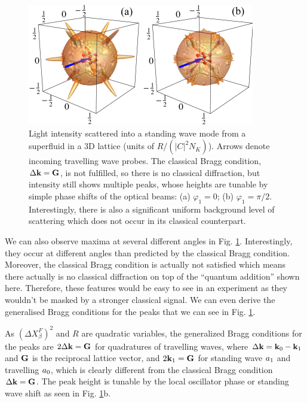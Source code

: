 \begin{figure}[htbp!]
  \centering
  \includegraphics[width=\linewidth]{Ep1}
  \caption[Light Scattering Angular Distribution]{Light intensity
    scattered into a standing wave mode from a superfluid in a 3D
    lattice (units of $R/(|C|^2N_K)$). Arrows denote incoming
    travelling wave probes. The classical Bragg condition,
    $\Delta \mathbf{k} = \mathbf{G}$, is not fulfilled, so there is no classical
    diffraction, but intensity still shows multiple peaks, whose
    heights are tunable by simple phase shifts of the optical beams:
    (a) $\varphi_1=0$; (b) $\varphi_1=\pi/2$. Interestingly, there is
    also a significant uniform background level of scattering which
    does not occur in its classical counterpart. }
  \label{fig:scattering}
\end{figure}

We can also observe maxima at several different angles in
Fig. \ref{fig:scattering}. Interestingly, they occur at different
angles than predicted by the classical Bragg condition. Moreover, the
classical Bragg condition is actually not satisfied which means there
actually is no classical diffraction on top of the ``quantum
addition'' shown here. Therefore, these features would be easy to see
in an experiment as they wouldn't be masked by a stronger classical
signal.  We can even derive the generalised Bragg conditions for the
peaks that we can see in Fig. \ref{fig:scattering}. 


As $(\Delta X^F_\beta)^2$ and $R$ are quadratic variables,
the generalized Bragg conditions for the peaks are
$2 \Delta \mathbf{k} = \mathbf{G}$ for quadratures of travelling waves, where
$\Delta \mathbf{k} = \mathbf{k}_0 - \mathbf{k}_1$ and $\mathbf{G}$ is the reciprocal
lattice vector, and $2 \mathbf{k}_1 = \mathbf{G}$ for standing wave $a_1$ and
travelling $a_0$, which is clearly different from the classical Bragg
condition $\Delta \mathbf{k} = \mathbf{G}$. The peak height is tunable by the
local oscillator phase or standing wave shift as seen in Fig.
\ref{fig:scattering}b.

